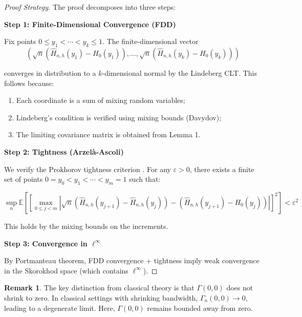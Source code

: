 \documentclass[12pt]{article}
\theoremstyle{plain}
\theoremstyle{definition}
\newtheorem{remark}[theorem]{Remark}
\newcommand{\eps}{\varepsilon}
\newcommand{\E}[1]{\mathbb{E}\left[#1\right]}
\newcommand{\1}[1]{\mathbf{1}_{#1}}
\begin{document}
\begin{proof}[Proof Strategy]
The proof decomposes into three steps:

\medskip

\noindent \textbf{Step 1: Finite-Dimensional Convergence (FDD)}

Fix points $0 \le y_1 < \cdots < y_k \le 1$. The finite-dimensional vector
\begin{equation}
\left(\sqrt{n}(\widehat{H}_{n,h}(y_1) - H_0(y_1)), \ldots, \sqrt{n}(\widehat{H}_{n,h}(y_k) - H_0(y_k))\right)
\end{equation}

converges in distribution to a $k$-dimensional normal by the Lindeberg CLT. This follows because:

\begin{enumerate}
\item Each coordinate is a sum of mixing random variables;
\item Lindeberg's condition is verified using mixing bounds (Davydov);
\item The limiting covariance matrix is obtained from Lemma 1.
\end{enumerate}

\medskip

\noindent \textbf{Step 2: Tightness (Arzelà-Ascoli)}

We verify the Prokhorov tightness criterion \citep{BiWi71}. For any $\eps > 0$, there exists a finite set of points $0 = y_0 < y_1 < \cdots < y_m = 1$ such that:

\begin{equation}
\sup_n \E{\left[\max_{0 \le j < m} \left|\sqrt{n}(\widehat{H}_{n,h}(y_{j+1}) - \widehat{H}_{n,h}(y_j)) - (\widehat{H}_{n,h}(y_{j+1}) - H_0(y_j))\right|\right]^2} < \eps^2
\end{equation}

This holds by the mixing bounds on the increments.

\medskip

\noindent \textbf{Step 3: Convergence in $\ell^\infty$}

By Portmanteau theorem, FDD convergence + tightness imply weak convergence in the Skorokhod space (which contains $\ell^\infty$).

\end{proof}

\begin{remark}
The key distinction from classical theory is that $\Gamma(0,0)$ does not shrink to zero. In classical settings with shrinking bandwidth, $\Gamma_n(0,0) \to 0$, leading to a degenerate limit. Here, $\Gamma(0,0)$ remains bounded away from zero.
\end{remark}
\end{document}
